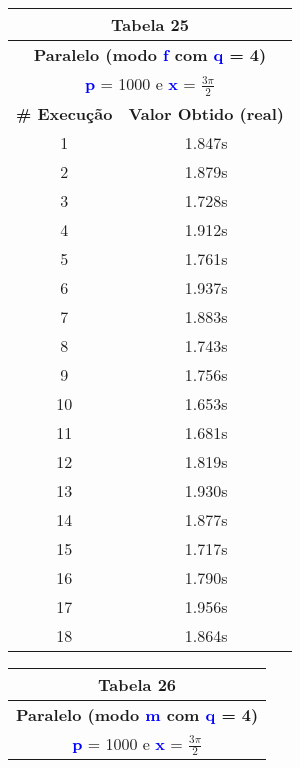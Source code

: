 \documentclass[11pt]{article}
\begin{document}
\begin{table}[!h]
	\begin{center}
		\begin{minipage}{0.48\textwidth}
			\begin{tabular}{| c | c |}
			\hline
			\multicolumn{2}{|c|}{\textbf{Tabela 25}} \\ \hline
			\multicolumn{2}{|c|}{\textbf{Paralelo (modo \textbf{\textcolor{blue}{f}} com \textbf{\textcolor{blue}{q}} = 4)}} \\
			\multicolumn{2}{|c|}{\textbf{\textcolor{blue}{p}} = 1000 e \textbf{\textcolor{blue}{x}} = $\frac{3\pi}{2}$} \\ [0.2ex]
			\hline
				\textbf{\# Execução} &  \textbf{Valor Obtido (real)} \\ \hline
				1 & 1.847s \\ \hline
				2 & 1.879s \\ \hline
				3 & 1.728s \\ \hline
				4 & 1.912s \\ \hline
				5 & 1.761s \\ \hline
				6 & 1.937s \\ \hline
				7 & 1.883s \\ \hline
				8 & 1.743s \\ \hline
				9 & 1.756s \\ \hline
				10 & 1.653s \\ \hline
				11 & 1.681s \\ \hline
				12 & 1.819s \\ \hline
				13 & 1.930s \\ \hline
				14 & 1.877s \\ \hline
				15 & 1.717s \\ \hline
				16 & 1.790s \\ \hline
				17 & 1.956s \\ \hline
				18 & 1.864s \\ \hline
			\end{tabular}
		\end{minipage}
		\begin{minipage}{0.48\textwidth}
			\begin{tabular}{| c | c |}
			\hline
			\multicolumn{2}{|c|}{\textbf{Tabela 26}} \\ \hline
			\multicolumn{2}{|c|}{\textbf{Paralelo (modo \textbf{\textcolor{blue}{m}} com \textbf{\textcolor{blue}{q}} = 4)}} \\
			\multicolumn{2}{|c|}{\textbf{\textcolor{blue}{p}} = 1000 e \textbf{\textcolor{blue}{x}} = $\frac{3\pi}{2}$} \\ [0.2ex]

\end{tabular}
\end{minipage}
\end{center}
\end{table}
\end{document}
